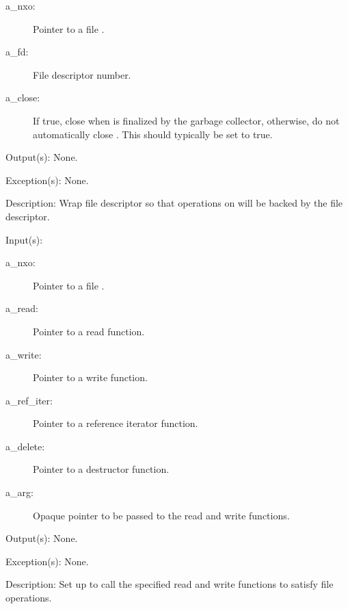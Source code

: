 \begin{capi}
\begin{capilist}
\begin{description}
		\item[a\_nxo: ]
			Pointer to a file .
		\item[a\_fd: ]
			File descriptor number.
		\item[a\_close: ] If true, close  when 
			is finalized by the garbage collector, otherwise, do
			not automatically close .  This should
			typically be set to true.
		\end{description}
	\item[Output(s): ] None.
	\item[Exception(s): ] None.
	\item[Description: ]
		Wrap file descriptor  so that operations on
		 will be backed by the file descriptor.
	\end{capilist}
\label{nxo_file_synthetic}
	\begin{capilist}
	\item[Input(s): ]
		\begin{description}\item[]
		\item[a\_nxo: ]
			Pointer to a file .
		\item[a\_read: ]
			Pointer to a read function.
		\item[a\_write: ]
			Pointer to a write function.
		\item[a\_ref\_iter: ]
			Pointer to a reference iterator function.
		\item[a\_delete: ]
			Pointer to a destructor function.
		\item[a\_arg: ]
			Opaque pointer to be passed to the read and write
			functions.
		\end{description}
	\item[Output(s): ] None.
	\item[Exception(s): ] None.
	\item[Description: ]
		Set up  to call the specified read and write
		functions to satisfy file operations.
	\end{capilist}
\label{nxo_file_open}
\end{capi}
